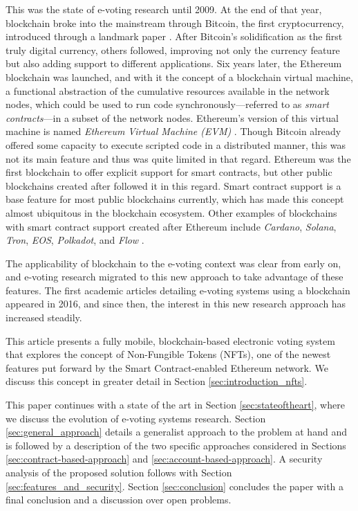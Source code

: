\documentclass[../main.tex]{subfiles}
\begin{document}
\par
This was the state of e-voting research until 2009. At the end of that year, blockchain broke into the mainstream through Bitcoin, the first cryptocurrency, introduced through a landmark paper \cite{Nakamoto2008}. After Bitcoin's solidification as the first truly digital currency, others followed, improving not only the currency feature but also adding support to different applications. Six years later, the Ethereum blockchain \cite{Dannen2016} was launched, and with it the concept of a blockchain virtual machine, a functional abstraction of the cumulative resources available in the network nodes, which could be used to run code synchronously—referred to as \textit{smart contracts}—in a subset of the network nodes. Ethereum's version of this virtual machine is named \textit{Ethereum Virtual Machine (EVM)} \cite{Antonopoulos2018}. Though Bitcoin already offered some capacity to execute scripted code in a distributed manner, this was not its main feature and thus was quite limited in that regard. Ethereum was the first blockchain to offer explicit support for smart contracts, but other public blockchains created after followed it in this regard. Smart contract support is a base feature for most public blockchains currently, which has made this concept almost ubiquitous in the blockchain ecosystem. Other examples of blockchains with smart contract support created after Ethereum include \textit{Cardano}, \textit{Solana}, \textit{Tron}, \textit{EOS}, \textit{Polkadot}, and \textit{Flow} \cite{cointree2022}.
\par
The applicability of blockchain to the e-voting context was clear from early on, and e-voting research migrated to this new approach to take advantage of these features. The first academic articles detailing e-voting systems using a blockchain appeared in 2016, and since then, the interest in this new research approach has increased steadily.
\par
This article presents a fully mobile, blockchain-based electronic voting system that explores the concept of Non-Fungible Tokens (NFTs), one of the newest features put forward by the Smart Contract-enabled Ethereum network. We discuss this concept in greater detail in Section \ref{sec:introduction_nfts}.
\par
This paper continues with a state of the art in Section \ref{sec:stateoftheart}, where we discuss the evolution of e-voting systems research. Section \ref{sec:general_approach} details a generalist approach to the problem at hand and is followed by a description of the two specific approaches considered in Sections \ref{sec:contract-based-approach} and \ref{sec:account-based-approach}. A security analysis of the proposed solution follows with Section \ref{sec:features_and_security}. Section \ref{sec:conclusion} concludes the paper with a final conclusion and a discussion over open problems.
\end{document}
